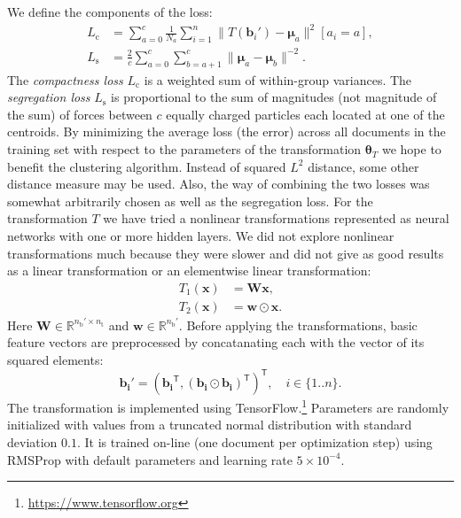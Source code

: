\documentclass[10pt, a4paper]{article}
\newcommand{\vect}[1]{\bm{#1}}
\newcommand{\matr}[1]{\vect{#1}}
\newcommand{\transpose}{\mathsf T}
\begin{document}
We define the components of the loss: 
\begin{align}
	L_\mathrm{c} &= \sum_{a=0}^{c}\frac{1}{N_a} 
		\sum_{i=1}^{n} \| T(\vect{b}_i')-\vect{\mu}_{a}\|^2 [a_i=a], \\
	L_\mathrm{s} &= \frac{2}{c}\sum_{a=0}^{c}\sum_{b=a+1}^{c} \|\vect{\mu}_a-\vect{\mu}_b\|^{-2}.
\end{align}
The \emph{compactness loss} $L_\mathrm{c}$ is a weighted sum of within-group variances. The \emph{segregation loss}  $L_\mathrm{s}$ is proportional to the sum of magnitudes (not magnitude of the sum) of forces between $c$ equally charged particles each located at one of the centroids. By minimizing the average loss (the error) across all documents in the training set with respect to the parameters of the transformation $\vect{\theta}_T$ we hope to benefit the clustering algorithm. Instead of squared $L^2$ distance, some other distance measure may be used. Also, the way of combining the two losses was somewhat arbitrarily chosen as well as the segregation loss. For the transformation $T$ we have tried a nonlinear transformations represented as neural networks with one or more hidden layers. We did not explore nonlinear transformations much because they were slower and did not give as good results as a linear transformation or an elementwise linear transformation:
\begin{align}
	T_\mathrm{1}(\vect{x}) &= \matr{W}\vect{x}, \\
	T_\mathrm{2}(\vect{x}) &= \vect{w}\odot\vect{x}.
\end{align}
Here $\matr{W}\in \mathbb{R}^{n_\mathrm{b}'\times n_\mathrm{t}}$ and $\vect{w}\in \mathbb{R}^{n_\mathrm{b}'}$.
Before applying the transformations, basic feature vectors are preprocessed by concatanating each with the vector of its squared elements:
\begin{equation}
	\vect{b_i'} = (\vect{b_i}^\transpose, (\vect{b_i}\odot\vect{b_i})^\transpose)^\transpose, \quad i\in \{1..n\}.
\end{equation}
The transformation is implemented using TensorFlow.\footnote{\url{https://www.tensorflow.org}} Parameters are randomly initialized with values from a truncated normal distribution with standard deviation $0.1$. It is trained on-line (one document per optimization step) using RMSProp \citep{tielman-2012} with default parameters and learning rate $5\times 10^{-4}$. 
\end{document}
